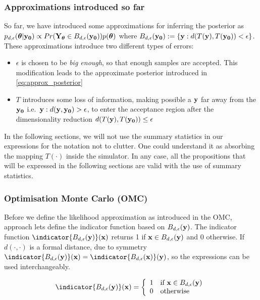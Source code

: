 \subsubsection{Approximations introduced so far}

So far, we have introduced some approximations for inferring the
posterior as
$p_{d,\epsilon}(\boldsymbol{\theta}|\mathbf{y_0}) \propto Pr(\mathbf{Y}_{\boldsymbol{\theta}} \in
B_{d,\epsilon}(\mathbf{y_0}))p(\boldsymbol{\theta})$ where
$B_{d,\epsilon}(\mathbf{y_0}) := \{\mathbf{y}: d(T(\mathbf{y}), T(\mathbf{y_0})) < \epsilon \}$. These
approximations introduce two different types of errors:

\begin{itemize}
\item $\epsilon$ is chosen to be \textit{big enough}, so that enough
  samples are accepted. This modification leads to the approximate posterior introduced in \eqref{eq:approx_posterior}
\item $T$ introduces some loss of information, making possible a $\mathbf{y}$ far
  away from the $\mathbf{y_0}$ i.e.\ $\mathbf{y}: d(\mathbf{y},\mathbf{y_0})>\epsilon$, to enter
  the acceptance region after the dimensionality reduction
  $d(T(\mathbf{y}), T(\mathbf{y_0})) \leq \epsilon$
\end{itemize}

\noindent
In the following sections, we will not use the summary statistics in
our expressions for the notation not to clutter. One could understand
it as absorbing the mapping $T(\cdot)$ inside the
simulator. In any case, all the propositions that will be expressed in the following sections are valid with
the use of summary statistics.
  
\subsubsection{Optimisation Monte Carlo (OMC)}

Before we define the likelihood approximation as introduced in the OMC,
approach lets define the indicator function based on $B_{d,\epsilon}(\mathbf{y})$. The indicator function $\indicator{\region(\yb)}(\xb)$ returns 1 if
$\mathbf{x} \in B_{d,\epsilon}(\mathbf{y})$ and 0 otherwise. If $d(\cdot,\cdot)$ is a
formal distance, due to symmetry
$\indicator{\region(\yb)}(\xb) = \indicator{\region(\xb)}(\yb)$, so
the expressions can be used interchangeably.

\begin{gather} \label{eq:indicator} \indicator{\region(\yb)}(\xb)=
  \left\{
    \begin{array}{ll}
      1 & \mbox{if } \xb \in \region(\yb) \\
      0 & \mbox{otherwise} 
    \end{array} \right. \end{gather}

